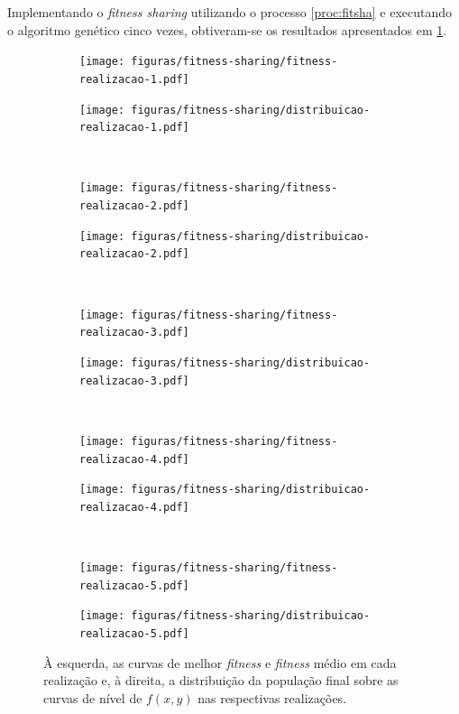 \documentclass[a4paper, 12pt]{article}
\newcommand{\fitness}{\textit{fitness}\xspace}
\newcommand{\fitsha}{\textit{fitness sharing}\xspace}
\begin{document}
Implementando o \fitsha utilizando o processo \ref{proc:fitsha} e executando o algoritmo genético cinco vezes, obtiveram-se os resultados apresentados em \ref{fig:fitness-distribuicao-sharing}.
\begin{figure}[!ht]
    \centering
    \begin{subfigure}{0.4\textwidth}
        \texttt{[image: figuras/fitness-sharing/fitness-realizacao-1.pdf]}
    \end{subfigure}
    \begin{subfigure}{0.4\textwidth}
        \texttt{[image: figuras/fitness-sharing/distribuicao-realizacao-1.pdf]}
    \end{subfigure}
    \hfill
    \\
    \centering
    \begin{subfigure}{0.4\textwidth}
        \texttt{[image: figuras/fitness-sharing/fitness-realizacao-2.pdf]}
    \end{subfigure}
    \begin{subfigure}{0.4\textwidth}
        \texttt{[image: figuras/fitness-sharing/distribuicao-realizacao-2.pdf]}
    \end{subfigure}
    \hfill
    \\
    \centering
    \begin{subfigure}{0.4\textwidth}
        \texttt{[image: figuras/fitness-sharing/fitness-realizacao-3.pdf]}
    \end{subfigure}
    \begin{subfigure}{0.4\textwidth}
        \texttt{[image: figuras/fitness-sharing/distribuicao-realizacao-3.pdf]}
    \end{subfigure}
    \hfill
    \\
    \centering
    \begin{subfigure}{0.4\textwidth}
        \texttt{[image: figuras/fitness-sharing/fitness-realizacao-4.pdf]}
    \end{subfigure}
    \begin{subfigure}{0.4\textwidth}
        \texttt{[image: figuras/fitness-sharing/distribuicao-realizacao-4.pdf]}
    \end{subfigure}
    \hfill
    \\
    \centering
    \begin{subfigure}{0.4\textwidth}
        \texttt{[image: figuras/fitness-sharing/fitness-realizacao-5.pdf]}
    \end{subfigure}
    \begin{subfigure}{0.4\textwidth}
        \texttt{[image: figuras/fitness-sharing/distribuicao-realizacao-5.pdf]}
    \end{subfigure}
    \hfill
    \caption{À esquerda, as curvas de melhor \fitness e \fitness médio em cada realização e, à direita, a distribuição da população final sobre as curvas de nível de $f(x, y)$ nas respectivas realizações.}
    \label{fig:fitness-distribuicao-sharing}
\end{figure}
\end{document}
